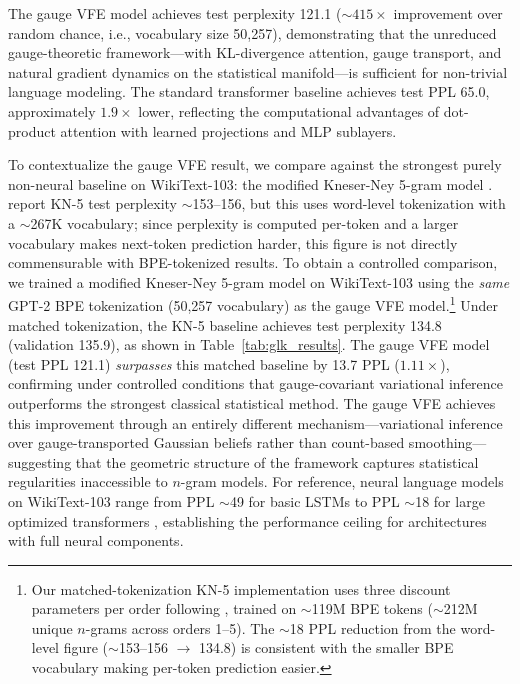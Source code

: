 \documentclass[twoside,11pt]{article}
\begin{document}
The gauge VFE model achieves test perplexity 121.1 (${\sim}415\times$ improvement over random chance, i.e., vocabulary size 50{,}257), demonstrating that the unreduced gauge-theoretic framework---with KL-divergence attention, gauge transport, and natural gradient dynamics on the statistical manifold---is sufficient for non-trivial language modeling. The standard transformer baseline achieves test PPL 65.0, approximately $1.9\times$ lower, reflecting the computational advantages of dot-product attention with learned projections and MLP sublayers.

To contextualize the gauge VFE result, we compare against the strongest purely non-neural baseline on WikiText-103: the modified Kneser-Ney 5-gram model \citep{chen1998empirical}. \citet{merity2017pointer} report KN-5 test perplexity $\sim$153--156, but this uses word-level tokenization with a $\sim$267K vocabulary; since perplexity is computed per-token and a larger vocabulary makes next-token prediction harder, this figure is not directly commensurable with BPE-tokenized results. To obtain a controlled comparison, we trained a modified Kneser-Ney 5-gram model on WikiText-103 using the \emph{same} GPT-2 BPE tokenization (50{,}257 vocabulary) as the gauge VFE model.\footnote{Our matched-tokenization KN-5 implementation uses three discount parameters per order following \citet{chen1998empirical}, trained on $\sim$119M BPE tokens ($\sim$212M unique $n$-grams across orders 1--5). The $\sim$18 PPL reduction from the word-level figure ($\sim$153--156 $\to$ 134.8) is consistent with the smaller BPE vocabulary making per-token prediction easier.} Under matched tokenization, the KN-5 baseline achieves test perplexity 134.8 (validation 135.9), as shown in Table~\ref{tab:glk_results}. The gauge VFE model (test PPL 121.1) \emph{surpasses} this matched baseline by 13.7 PPL ($1.11\times$), confirming under controlled conditions that gauge-covariant variational inference outperforms the strongest classical statistical method. The gauge VFE achieves this improvement through an entirely different mechanism---variational inference over gauge-transported Gaussian beliefs rather than count-based smoothing---suggesting that the geometric structure of the framework captures statistical regularities inaccessible to $n$-gram models. For reference, neural language models on WikiText-103 range from PPL $\sim$49 for basic LSTMs \citep{grave2017improving} to PPL $\sim$18 for large optimized transformers \citep{dai2019transformerxl}, establishing the performance ceiling for architectures with full neural components.
\end{document}

